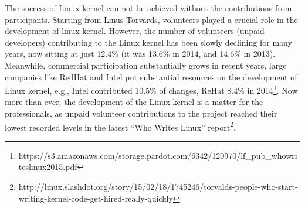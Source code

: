 \documentclass{sig-alternate-05-2015}
\begin{document}
{The success of Linux kernel can not be achieved without the contributions
from participants. Starting from Linus Torvards,  volunteers
played a crucial role in the development of linux kernel.
However, the number of volunteers (unpaid developers) contributing to the
Linux kernel has been slowly declining for many years, now sitting at just
 12.4\% (it was 13.6\% in 2014, and 14.6\% in 2013).
Meanwhile, commercial participation substantially grows in recent years,
large companies like RedHat and Intel put substantial resources on the development
of Linux kernel, e.g., Intel contributed 10.5\% of changes, ReHat 8.4\%
in 2014\footnote{https://s3.amazonaws.com/storage.pardot.com/6342/120970/lf\_pub\_whowriteslinux2015.pdf}.
Now more than ever, the development of the Linux kernel is a matter for
the professionals, as unpaid volunteer contributions to the project reached their
lowest recorded levels in the latest ``Who Writes Linux''
report\footnote{http://linux.slashdot.org/story/15/02/18/1745246/torvalds-people-who-start-writing-kernel-code-get-hired-really-quickly}.

\begin{comment}
As for why Linux is now mostly developed by well-paid engineers, the
possible reasons are myriad. The most obvious and compelling reason
is that these big companies have a commercial interest in the continued
good health of Linux. 10 years ago, Linux was the plaything of hobbyists
and supercomputer makers -- today, it powers everything from smartphones
(Android) to wireless routers to set-top boxes. The continuing commercial
interest in Linux is highlighted by another statistic from The Linux
Foundation report: In mid-2011, only 191 companies were involved in the
Linux kernel; by the end of 2013, that number was up to
243\footnote{www.extremetech.com/computing/175919-who-actually-develops-linux-the-answer-might-surprise-you}.
\end{comment}

}
\end{document}
